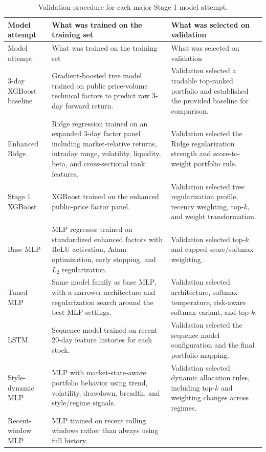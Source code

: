 \documentclass[11pt]{article}
\begin{document}
{\small
\setlength{\tabcolsep}{4pt}
\begin{longtable}{p{}p{}p{}}
\caption{Validation procedure for each major Stage 1 model attempt.}
\label{tab:validation-procedure}\\
\toprule
Model attempt & What was trained on the training set & What was selected on validation \\
\midrule
\endfirsthead
\toprule
Model attempt & What was trained on the training set & What was selected on validation \\
\midrule
\endhead
3-day XGBoost baseline &
Gradient-boosted tree model trained on public price-volume technical factors
to predict raw 3-day forward return. &
Validation selected a tradable top-ranked portfolio and established the
provided baseline for comparison. \\
\midrule
Enhanced Ridge &
Ridge regression trained on an expanded 3-day factor panel including
market-relative returns, intraday range, volatility, liquidity, beta, and
cross-sectional rank features. &
Validation selected the Ridge regularization strength and score-to-weight
portfolio rule. \\
\midrule
Stage 1 XGBoost &
XGBoost trained on the enhanced public-price factor panel. &
Validation selected tree regularization profile, recency weighting, top-\(k\),
and weight transformation. \\
\midrule
Base MLP &
MLP regressor trained on standardized enhanced factors with ReLU activation,
Adam optimization, early stopping, and \(L_2\) regularization. &
Validation selected top-\(k\) and capped score/softmax weighting. \\
\midrule
Tuned MLP &
Same model family as base MLP, with a narrower architecture and regularization
search around the best MLP settings. &
Validation selected architecture, softmax temperature, risk-aware softmax
variant, and top-\(k\). \\
\midrule
LSTM &
Sequence model trained on recent 20-day feature histories for each stock. &
Validation selected the sequence model configuration and the final portfolio
mapping. \\
\midrule
Style-dynamic MLP &
MLP with market-state-aware portfolio behavior using trend, volatility,
drawdown, breadth, and style/regime signals. &
Validation selected dynamic allocation rules, including top-\(k\) and weighting
changes across regimes. \\
\midrule
Recent-window MLP &
MLP trained on recent rolling windows rather than always using full history. &

\end{longtable}}
\end{document}
